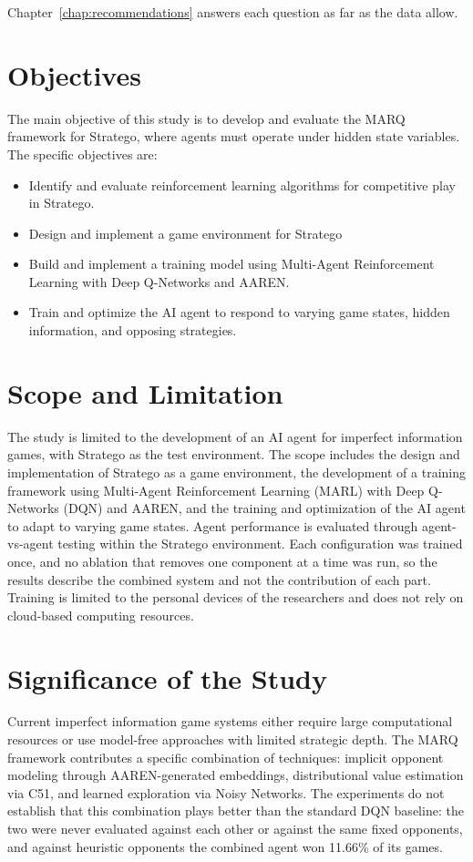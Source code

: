 Chapter~\ref{chap:recommendations} answers each question as far as the data allow.

\section{Objectives}
The main objective of this study is to develop and evaluate the MARQ framework for Stratego, where agents must operate under hidden state variables. The specific objectives are:
\begin{itemize}
    \item Identify and evaluate reinforcement learning algorithms for competitive play in Stratego.
    \item Design and implement a game environment for Stratego
    \item Build and implement a training model using Multi-Agent Reinforcement Learning with Deep Q-Networks and AAREN.
    \item Train and optimize the AI agent to respond to varying game states, hidden information, and opposing strategies.
\end{itemize}

\section{Scope and Limitation}

The study is limited to the development of an AI agent for imperfect information games, with Stratego as the test environment. The scope includes the design and implementation of Stratego as a game environment, the development of a training framework using Multi-Agent Reinforcement Learning (MARL) with Deep Q-Networks (DQN) and AAREN, and the training and optimization of the AI agent to adapt to varying game states. Agent performance is evaluated through agent-vs-agent testing within the Stratego environment. Each configuration was trained once, and no ablation that removes one component at a time was run, so the results describe the combined system and not the contribution of each part. Training is limited to the personal devices of the researchers and does not rely on cloud-based computing resources.

\section{Significance of the Study}
Current imperfect information game systems either require large computational resources or use model-free approaches with limited strategic depth. The MARQ framework contributes a specific combination of techniques: implicit opponent modeling through AAREN-generated embeddings, distributional value estimation via C51, and learned exploration via Noisy Networks. The experiments do not establish that this combination plays better than the standard DQN baseline: the two were never evaluated against each other or against the same fixed opponents, and against heuristic opponents the combined agent won 11.66\% of its games.


